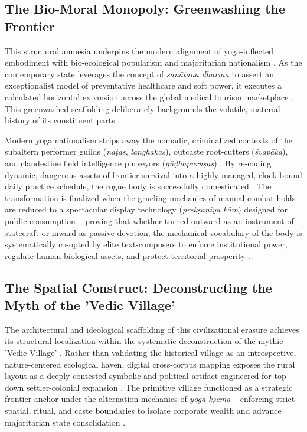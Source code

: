 \documentclass[11pt,twoside,letterpaper]{article}
\begin{document}
\subsection{The Bio-Moral Monopoly: Greenwashing the Frontier}
This structural amnesia underpins the modern alignment of yoga-inflected embodiment with bio-ecological popularism and majoritarian nationalism \citep{McCartney2021}. As the contemporary state leverages the concept of \textit{san\={a}tana dharma} to assert an exceptionalist model of preventative healthcare and soft power, it executes a calculated horizontal expansion across the global medical tourism marketplace \citep{McCartney2021}. This greenwashed scaffolding deliberately backgrounds the volatile, material history of its constituent parts \citep{McCartney2021}.

Modern yoga nationalism strips away the nomadic, criminalized contexts of the subaltern performer guilds (\textit{na\d{t}as}, \textit{la\d{n}ghakas}), outcaste root-cutters (\textit{\'svap\={a}ka}), and clandestine field intelligence purveyors (\textit{g\={u}\d{d}hapuru\d{s}as}) \citep{McCartney2021}. By re-coding dynamic, dangerous assets of frontier survival into a highly managed, clock-bound daily practice schedule, the rogue body is successfully domesticated \citep{McCartney2021}. The transformation is finalized when the grueling mechanics of manual combat holds are reduced to a spectacular display technology (\textit{prek\d{s}a\d{n}\={i}ya k\={a}m}) designed for public consumption – proving that whether turned outward as an instrument of statecraft or inward as passive devotion, the mechanical vocabulary of the body is systematically co-opted by elite text-composers to enforce institutional power, regulate human biological assets, and protect territorial prosperity \citep{McCartney2021}.

\subsection{The Spatial Construct: Deconstructing the Myth of the 'Vedic Village'}
The architectural and ideological scaffolding of this civilizational erasure achieves its structural localization within the systematic deconstruction of the mythic 'Vedic Village' \citep{McCartney2026}. Rather than validating the historical village as an introspective, nature-centered ecological haven, digital cross-corpus mapping exposes the rural layout as a deeply contested symbolic and political artifact engineered for top-down settler-colonial expansion \citep{McCartney2026}. The primitive village functioned as a strategic frontier anchor under the alternation mechanics of \textit{yoga-k\d{s}ema} – enforcing strict spatial, ritual, and caste boundaries to isolate corporate wealth and advance majoritarian state consolidation \citep{McCartney2026}.
\end{document}
